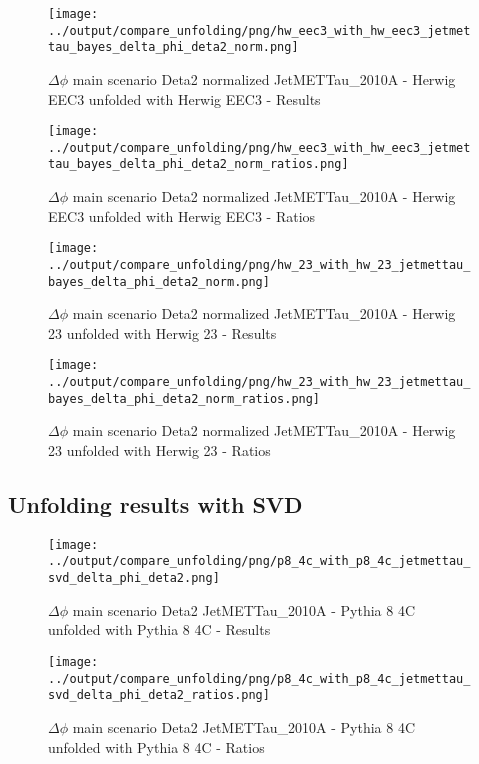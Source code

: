 \documentclass[11pt]{book}
\begin{document}
\begin{figure}[ht]
\centering
\texttt{[image: ../output/compare\_unfolding/png/hw\_eec3\_with\_hw\_eec3\_jetmettau\_bayes\_delta\_phi\_deta2\_norm.png]}
\caption{$\Delta\phi$ main scenario Deta2 normalized JetMETTau\_2010A - Herwig EEC3 unfolded with Herwig EEC3 - Results}
\label{hw_eec3_hw_eec3_jetmettau_bayes_delta_phi_deta2_norm_a}
\end{figure}

\begin{figure}[ht]
\centering
\texttt{[image: ../output/compare\_unfolding/png/hw\_eec3\_with\_hw\_eec3\_jetmettau\_bayes\_delta\_phi\_deta2\_norm\_ratios.png]}
\caption{$\Delta\phi$ main scenario Deta2 normalized JetMETTau\_2010A - Herwig EEC3 unfolded with Herwig EEC3 - Ratios}
\label{hw_eec3_hw_eec3_jetmettau_bayes_delta_phi_deta2_norm_b}
\end{figure}

\begin{figure}[ht]
\centering
\texttt{[image: ../output/compare\_unfolding/png/hw\_23\_with\_hw\_23\_jetmettau\_bayes\_delta\_phi\_deta2\_norm.png]}
\caption{$\Delta\phi$ main scenario Deta2 normalized JetMETTau\_2010A - Herwig 23 unfolded with Herwig 23 - Results}
\label{hw_23_hw_23_jetmettau_bayes_delta_phi_deta2_norm_a}
\end{figure}

\begin{figure}[ht]
\centering
\texttt{[image: ../output/compare\_unfolding/png/hw\_23\_with\_hw\_23\_jetmettau\_bayes\_delta\_phi\_deta2\_norm\_ratios.png]}
\caption{$\Delta\phi$ main scenario Deta2 normalized JetMETTau\_2010A - Herwig 23 unfolded with Herwig 23 - Ratios}
\label{hw_23_hw_23_jetmettau_bayes_delta_phi_deta2_norm_b}
\end{figure}


\clearpage
\subsection{Unfolding results with SVD}
\begin{figure}[ht]
\centering
\texttt{[image: ../output/compare\_unfolding/png/p8\_4c\_with\_p8\_4c\_jetmettau\_svd\_delta\_phi\_deta2.png]}
\caption{$\Delta\phi$ main scenario Deta2 JetMETTau\_2010A - Pythia 8 4C unfolded with Pythia 8 4C - Results}
\label{p8_p8_jetmettau_svd_delta_phi_deta2_a}
\end{figure}

\begin{figure}[ht]
\centering
\texttt{[image: ../output/compare\_unfolding/png/p8\_4c\_with\_p8\_4c\_jetmettau\_svd\_delta\_phi\_deta2\_ratios.png]}
\caption{$\Delta\phi$ main scenario Deta2 JetMETTau\_2010A - Pythia 8 4C unfolded with Pythia 8 4C - Ratios}
\label{p8_p8_jetmettau_svd_delta_phi_deta2_b}
\end{figure}
\end{document}
